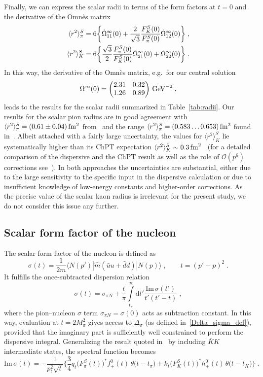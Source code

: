 \documentclass[11pt]{article}%
\providecommand{\ec}{\;,}
\providecommand{\ep}{\;.}
\providecommand{\nt}{\notag}
\newcommand{\diff}{\text{d}}
\newcommand{\mpi}{M_{\pi}}
\newcommand{\tpi}{t_\pi}
\newcommand{\tK}{t_K}
\newcommand{\beq}{\begin{equation}}
\newcommand{\eeq}{\end{equation}}
\newcommand{\Order}{\mathcal{O}}
\renewcommand{\Im}{\text{Im}\,}
\begin{document}
Finally, we can express the scalar radii in terms of the form factors at $t=0$ and the derivative of the Omn\`es matrix
\begin{align}
\langle r^2\rangle^S_\pi&=6\bigg\{\dot\Omega_{11}^\infty(0)+\frac{2}{\sqrt{3}}\frac{F^S_K(0)}{F^S_\pi(0)}\dot\Omega_{12}^\infty(0)\bigg\}\ec\nt\\
\langle r^2\rangle^S_K&=6\bigg\{\frac{\sqrt{3}}{2}\frac{F^S_\pi(0)}{F^S_K(0)}\dot\Omega_{21}^\infty(0)+\dot\Omega_{22}^\infty(0)\bigg\}\ep
\end{align}
In this way, the derivative of the Omn\`es matrix, e.g.\ for our central solution
\beq
\dot\Omega^\infty(0)=\begin{pmatrix}
                      2.31 & 0.32\\ 1.26 & 0.89
                     \end{pmatrix}
\,{\rm GeV}^{-2}\ec
\eeq
leads to the results for the scalar radii summarized in Table~\ref{tab:radii}. Our results for the scalar pion radius are in good agreement with $\langle r^2\rangle^S_\pi=(0.61\pm0.04)\,{\rm fm^2}$ from~\cite{CGL01} and the range $\langle r^2\rangle^S_\pi=(0.583\ldots 0.653)\,{\rm fm^2}$ found in~\cite{Moussallam99}. Albeit attached with a fairly large uncertainty, the values for $\langle r^2\rangle^S_K$ lie systematically higher than its ChPT expectation $\langle r^2\rangle^S_K\sim 0.3\,{\rm fm}^2$~\cite{FKM02} (for a detailed comparison of the dispersive and the ChPT result as well as the role of $\Order(p^6)$ corrections see~\cite{Bijnens_Dhonte}). In both approaches the uncertainties are substantial, either due to the large sensitivity to the specific input in the dispersive calculation or due to insufficient knowledge of low-energy constants and higher-order corrections. As the precise value of the scalar kaon radius is irrelevant for the present study, we do not consider this issue any further. 


\subsection{Scalar form factor of the nucleon}

The scalar form factor of the nucleon is defined as
\beq
\sigma(t)=\frac{1}{2m}\langle N(p')|\hat m(\bar u u+\bar d d)|N(p)\rangle\ec\qquad t=(p'-p)^2\ep
\eeq
It fulfills the once-subtracted dispersion relation
\beq
\sigma(t)=\sigma_{\pi N}+\frac{t}{\pi}\int\limits_{\tpi}^\infty\diff t'\frac{\Im\sigma(t')}{t'(t'-t)}\ec
\eeq
where the pion--nucleon $\sigma$ term $\sigma_{\pi N}=\sigma(0)$ acts as subtraction constant. In this way, evaluation at $t=2\mpi^2$ gives access to $\Delta_\sigma$ (as defined in~\eqref{Delta_sigma_def}), provided that the imaginary part is sufficiently well constrained to perform the dispersive integral. Generalizing the result quoted in~\cite{GLS90_FF} by including $\bar K K$ intermediate states, the spectral function becomes
\beq
\label{unitarity_sigma_term}
\Im\sigma(t)=-\frac{1}{p_t^2\sqrt{t}}\bigg\{\frac{3}{4}q_t\big(F^S_\pi(t)\big)^*f^0_+(t)\,\theta\big(t-\tpi\big)+k_t\big(F^S_K(t)\big)^*h^0_+(t)\,\theta\big(t-\tK\big)\bigg\}\ep
\eeq
\end{document}

